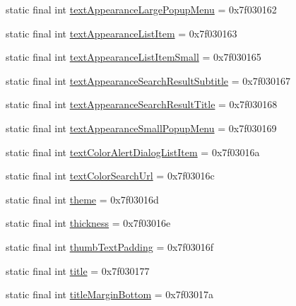\begin{DoxyCompactItemize}
\item 
static final int \mbox{\hyperlink{classcom_1_1google_1_1android_1_1gms_1_1R_1_1attr_ab9ded2713bb14b64d308f1d61be774f4}{text\+Appearance\+Large\+Popup\+Menu}} = 0x7f030162
\item 
static final int \mbox{\hyperlink{classcom_1_1google_1_1android_1_1gms_1_1R_1_1attr_a07ade51b10a3ef2e8d28e76d864cebd3}{text\+Appearance\+List\+Item}} = 0x7f030163
\item 
static final int \mbox{\hyperlink{classcom_1_1google_1_1android_1_1gms_1_1R_1_1attr_ae3ab48e3e23f48314e9524fe62be0e23}{text\+Appearance\+List\+Item\+Small}} = 0x7f030165
\item 
static final int \mbox{\hyperlink{classcom_1_1google_1_1android_1_1gms_1_1R_1_1attr_a9b33dd33691bd03b8e82788ce1586c98}{text\+Appearance\+Search\+Result\+Subtitle}} = 0x7f030167
\item 
static final int \mbox{\hyperlink{classcom_1_1google_1_1android_1_1gms_1_1R_1_1attr_a444de312ff77fcef2a770ac1ffac9b48}{text\+Appearance\+Search\+Result\+Title}} = 0x7f030168
\item 
static final int \mbox{\hyperlink{classcom_1_1google_1_1android_1_1gms_1_1R_1_1attr_a1a8a0c40772572081b7ecdb6e2eb3e8c}{text\+Appearance\+Small\+Popup\+Menu}} = 0x7f030169
\item 
static final int \mbox{\hyperlink{classcom_1_1google_1_1android_1_1gms_1_1R_1_1attr_a6fca3aeaeef46da82594fd7ad3ded541}{text\+Color\+Alert\+Dialog\+List\+Item}} = 0x7f03016a
\item 
static final int \mbox{\hyperlink{classcom_1_1google_1_1android_1_1gms_1_1R_1_1attr_a94c21fa89ffb5abc9da746e2bcca05b6}{text\+Color\+Search\+Url}} = 0x7f03016c
\item 
static final int \mbox{\hyperlink{classcom_1_1google_1_1android_1_1gms_1_1R_1_1attr_ac922c1584a2a1de5f1c60f95a1c026db}{theme}} = 0x7f03016d
\item 
static final int \mbox{\hyperlink{classcom_1_1google_1_1android_1_1gms_1_1R_1_1attr_aecc56574198e15f61947775a43ef2420}{thickness}} = 0x7f03016e
\item 
static final int \mbox{\hyperlink{classcom_1_1google_1_1android_1_1gms_1_1R_1_1attr_aac74cd1fce2ccc307e418937549d40a4}{thumb\+Text\+Padding}} = 0x7f03016f
\item 
static final int \mbox{\hyperlink{classcom_1_1google_1_1android_1_1gms_1_1R_1_1attr_ad79bcf9ed7cb942dda80372ff1f5ab36}{title}} = 0x7f030177
\item 
static final int \mbox{\hyperlink{classcom_1_1google_1_1android_1_1gms_1_1R_1_1attr_a542dd30118ed279dd41fd8951a240247}{title\+Margin\+Bottom}} = 0x7f03017a

\end{DoxyCompactItemize}
